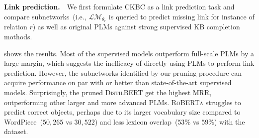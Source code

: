 \textbf{Link prediction.}~~We first formulate CKBC as a link prediction task 
and compare subnetworks~(i.e., $\mathcal{LM}_{\theta_r}$ 
is queried to predict missing link for instance of relation $r$) as well as original PLMs
against strong supervised KB completion mothods. 


 shows the results. Most of the supervised 
models outperform full-scale PLMs by a large margin, which suggests the 
inefficacy of directly using PLMs to perform link prediction. However, 
the subnetworks identified by our pruning procedure can
acquire performance on par with or better than state-of-the-art 
supervised models. Surprisingly, the pruned \textsc{DistilBERT} get the 
highest MRR, outperforming other larger and more advanced PLMs. 
\textsc{RoBERTa} struggles to predict correct objects, perhaps due to 
its larger vocabulary size compared to WordPiece~($50,265$ vs $30,522$) 
and less lexicon overlap~($53\%$ vs $59\%$) with the dataset.



